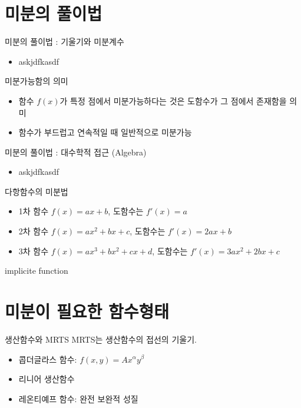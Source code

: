\documentclass[aspectratio=169]{beamer}
\begin{document}
\section{미분의 풀이법}
\begin{frame}{미분의 풀이법 : 기울기와 미분계수}
  \begin{itemize}
    \item askjdfkasdf
  \end{itemize}
\end{frame}

\begin{frame}{미분가능함의 의미}
  \begin{itemize}
    \item 함수 \( f(x) \)가 특정 점에서 미분가능하다는 것은 도함수가 그 점에서 존재함을 의미
    \item 함수가 부드럽고 연속적일 때 일반적으로 미분가능
  \end{itemize}
\end{frame}


\begin{frame}{미분의 풀이법 : 대수학적 접근 (Algebra)}
  \begin{itemize}
    \item askjdfkasdf
  \end{itemize}
\end{frame}



\begin{frame}{다항함수의 미분법}
  \begin{itemize}
    \item 1차 함수 \( f(x)=ax+b \), 도함수는 \( f'(x)=a \)
    \item 2차 함수 \( f(x)=ax^2+bx+c \), 도함수는 \( f'(x)=2ax+b \)
    \item 3차 함수 \( f(x)=ax^3+bx^2+cx+d \), 도함수는 \( f'(x)=3ax^2+2bx+c \)
  \end{itemize}
\end{frame}

\begin{frame}{implicite function}
  
\end{frame}



\section{미분이 필요한 함수형태}




\begin{frame}{생산함수와 MRTS}
  MRTS는 생산함수의 접선의 기울기.
  \begin{itemize}
    \item 콥더글라스 함수: \( f(x,y)=Ax^\alpha y^\beta \)
    \item 리니어 생산함수
    \item 레온티예프 함수: 완전 보완적 성질
  \end{itemize}
\end{frame}
\end{document}
